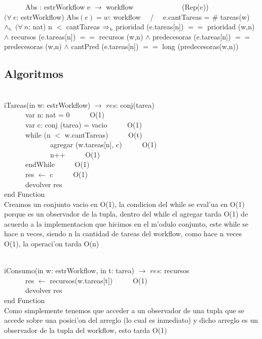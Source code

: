 \documentclass[a4paper,10pt]{article}
\begin{document}
   \indent \ \ \ \ \ \ Abs : estrWorkflow e $\rightarrow$ workflow \ \ \ \ \ \ \ \ \ \ \ \ \ (Rep($e$))\\
   
   $(\forall\ e$: estrWorkflow) {Abs$(e) = w$: workflow} \ \ / \ \ 
e.cantTareas = $\#$ tareas(w) $\land_{\mathrm{\scriptscriptstyle{L}}}$ $(\forall\ n$: nat) n $<$ cantTareas $\Rightarrow_{\mathrm{\scriptscriptstyle{L}}}$ prioridad (e.tareas[n]) $==$ prioridad (w,n) $\wedge$  recursos (e.tareas[n]) $==$ recursos (w,n) $\wedge$ predecesoras (e.tareas[n]) $==$ predecesoras (w,n) $\wedge$ cantPred (e.tareas[n]) $==$ long (predecesoras(w,n)) \\

\newpage
\subsection{Algoritmos}

\begin{algoritmo}
\caption{}\\

  iTareas(in w: estrWorkflow) $\rightarrow$ $res$: conj(tarea) \\
	\indent \ \ \ \ \ \  var n: nat = 0  \ \ \ \ \ O(1)\\  
	\indent \ \ \ \ \ \  var c: conj (tarea) = vacio  \ \ \ \ \ O(1)\\  
	\indent \ \ \ \ \ \  while (n $<$ w.cantTareas)  \ \ \ \ \ O(t)\\
	\indent \ \ \ \ \ \ \ \ \ \ \ \ \ agregar (w.tareas[n], c) \ \ \ \ \ O(1) \\
	\indent \ \ \ \ \ \ \ \ \ \ \ \ \ n++ \ \ \ \ \ O(1) \\
	\indent \ \ \ \ \ \  endWhile \ \ \ \ \ O(1)\\  
	\indent \ \ \ \ \ \  res $\gets$ c   \ \ \ \ \ O(1)\\   
	\indent \ \ \ \ \ \  devolver res    \\
   end Function \\
   
  Creamos un conjunto vacio en O(1), la condicion del while se eval'ua en O(1) porque es un observador de la tupla, dentro del while el agregar tarda O(1) de acuerdo a la implementacion que hicimos en el m'odulo conjunto, este while se hace n veces, siendo n la cantidad de tareas del workflow, como hace n veces O(1), la operaci'on tarda O(n) 
\end{algoritmo}

\begin{algoritmo}
\caption{}\\
  iConsumo(in w: estrWorkflow, in t: tarea) $\rightarrow$ $res$: recursos\\
    \indent \ \ \ \ \ \  res $\gets$ recursos(w.tareas[t])   \ \ \ \ \ O(1)\\   
    \indent \ \ \ \ \ \  devolver res    \\
   end Function \\
   
   Como simplemente tenemos que acceder a un observador de una tupla que se accede sobre una posici'on del arreglo (lo cual es inmediato) y dicho arreglo es un observador de la tupla del workflow, esto tarda O(1) 
\end{algoritmo}
	    
\end{document}
